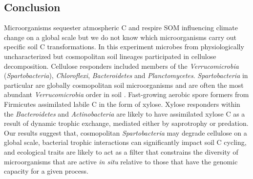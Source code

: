 \subsection{Conclusion} 
Microorganisms sequester atmospheric C and respire SOM influencing climate
change on a global scale but we do not know which microorganisms carry out
specific soil C transformations. In this experiment microbes from
physiologically uncharacterized but cosmopolitan soil lineages participated in
cellulose decomposition. Cellulose responders included members of the
\textit{Verrucomicrobia} (\textit{Spartobacteria}), \textit{Chloroflexi},
\textit{Bacteroidetes} and \textit{Planctomycetes}. \textit{Spartobacteria} in
particular are globally cosmopolitan soil microorganisms and are often the most
abundant \textit{Verrucomicrobia} order in soil \citep{Bergmann_2011}.
Fast-growing aerobic spore formers from Firmicutes assimilated labile C in the
form of xylose. Xylose responders within the \textit{Bacteroidetes} and
\textit{Actinobacteria} are likely to have assimilated xylose C as a result of
dynamic trophic exchange, mediated either by saprotrophy or predation. Our
results suggest that, cosmopolitan \textit{Spartobacteria} may degrade
cellulose on a global scale, bacterial trophic interactions can significantly
impact soil C cycling, and ecological traits are likely to act as a filter that
constrains the diversity of microorganisms that are active \textit{in situ}
relative to those that have the genomic capacity for a given process.

